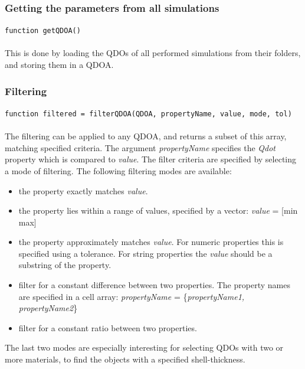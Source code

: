 			\subsubsection{Getting the parameters from all simulations}
				\lstinline{function getQDOA()}\\\\
				This is done by loading the QDOs of all performed simulations from their folders, and storing them in a QDOA.
				 
			\subsubsection{Filtering}
				\lstinline{function filtered = filterQDOA(QDOA, propertyName, value, mode, tol)}\\\\
				The filtering can be applied to any QDOA, and returns a subset of this array, matching specified criteria. The argument \textit{propertyName} 
				specifies the \textit{Qdot} property which is compared to \textit{value}. The filter criteria are specified by selecting a mode of filtering. 
				The following filtering modes are available:\\
				\begin{itemize}
					\item the property exactly matches \textit{value}.
					\item the property lies within a range of values, specified by a vector: \textit{value} = [min max]
					\item the property approximately matches \textit{value}. For numeric properties this is specified using a tolerance. For string properties the \textit{value} 
					should be a substring of the property.
					\item filter for a constant difference between two properties. The property names are specified in a cell array: \textit{propertyName} 
					= \{\textit{propertyName1, propertyName2}\}
					\item filter for a constant ratio between two properties.
				\end{itemize}
				The last two modes are especially interesting for selecting \glspl{QDO} with two or more materials, to find the objects with a specified shell-thickness.\\
				\newpage
